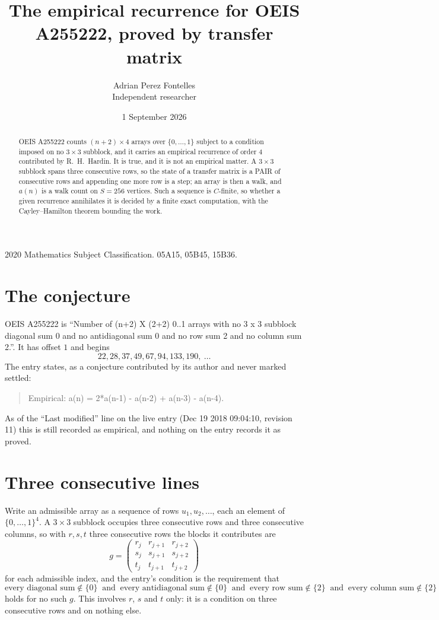 \documentclass[11pt,a4paper]{article}
\title{The empirical recurrence for OEIS A255222, proved by transfer matrix}
\author{Adrian Perez Fontelles\\ \small Independent researcher}
\date{1 September 2026}
\theoremstyle{plain}
\theoremstyle{definition}
\begin{document}
\maketitle

\begin{abstract}
OEIS A255222 counts $(n+2)\times4$ arrays over $\{0,\dots,1\}$ subject to a condition imposed on
no $3\times3$ subblock, and it carries an empirical recurrence of order $4$
contributed by R.~H.~Hardin. It is true, and it is not an empirical matter. A $3\times3$
subblock spans three consecutive rows, so the state of a transfer matrix is a PAIR of
consecutive rows and appending one more row is a step; an array is then a walk, and
$a(n)$ is a walk count on $S=256$ vertices. Such a sequence is $C$-finite, so whether a given
recurrence annihilates it is decided by a finite exact computation, with the Cayley--Hamilton
theorem bounding the work.
\end{abstract}

\noindent\small 2020 Mathematics Subject Classification. 05A15, 05B45, 15B36.\normalsize

\section{The conjecture}

OEIS A255222 is ``Number of (n+2) X (2+2) 0..1 arrays with no 3 x 3 subblock diagonal sum 0 and no antidiagonal sum 0 and no row sum 2 and no column sum 2.''. It has offset $1$ and begins
\[
22, 28, 37, 49, 67, 94, 133, 190,\ \dots
\]
The entry states, as a conjecture contributed by its author and never marked settled:
\begin{quote}
Empirical: a(n) = 2*a(n-1) - a(n-2) + a(n-3) - a(n-4).
\end{quote}
As of the ``Last modified'' line on the live entry (Dec 19 2018 09:04:10, revision 11) this is still
recorded as empirical, and nothing on the entry records it as proved.

\section{Three consecutive lines}

Write an admissible array as a sequence of rows $u_1,u_2,\dots$, each an element of
$\{0,\dots,1\}^{4}$. A $3\times3$ subblock occupies three consecutive rows and
three consecutive columns, so with $r,s,t$ three consecutive rows the blocks it
contributes are
\[
g=\begin{pmatrix}r_j&r_{j+1}&r_{j+2}\\ s_j&s_{j+1}&s_{j+2}\\ t_j&t_{j+1}&t_{j+2}\end{pmatrix}
\]
for each admissible index, and the entry's condition is the requirement that
\[
\text{every diagonal sum} \notin \{0\}\ \text{ and }\ \text{every antidiagonal sum} \notin \{0\}\ \text{ and }\ \text{every row sum} \notin \{2\}\ \text{ and }\ \text{every column sum} \notin \{2\}
\]
holds for no such $g$. This involves $r$, $s$ and $t$ only: it is a condition on
three consecutive rows and on nothing else.
\end{document}
